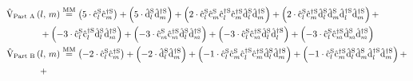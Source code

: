 \begin{equation}
    \label{eq:interaction-picture-v-ham-parts}
    \begin{split}
        \VhamiltonianPartA{l}{m} &\stackrel{\text{MM}}{=} 
            \left(5 \cdot \cop[\schroedingerPicture]{l}{}\cop[\schroedingerPicture]{m}{\dagger}\right)
            +
            \left(5 \cdot \dop[\schroedingerPicture]{l}{}\dop[\schroedingerPicture]{m}{\dagger}\right)
            +
            \left(2 \cdot \cop[\schroedingerPicture]{l}{}\cop[\schroedingerPicture]{m}{}\cop[\schroedingerPicture]{l}{\dagger}\cop[\schroedingerPicture]{m}{\dagger}\dop[\schroedingerPicture]{l}{}\dop[\schroedingerPicture]{m}{\dagger}\right)
            +
            \left(2 \cdot \cop[\schroedingerPicture]{l}{}\cop[\schroedingerPicture]{m}{\dagger}\dop[\schroedingerPicture]{l}{}\dop[\schroedingerPicture]{m}{}\dop[\schroedingerPicture]{l}{\dagger}\dop[\schroedingerPicture]{m}{\dagger}\right)
            +\\&\mkern-40mu+
            \left(-3 \cdot \cop[\schroedingerPicture]{l}{}\cop[\schroedingerPicture]{l}{\dagger}\dop[\schroedingerPicture]{l}{}\dop[\schroedingerPicture]{m}{\dagger}\right)
            +
            \left(-3 \cdot \cop[\schroedingerPicture]{m}{}\cop[\schroedingerPicture]{m}{\dagger}\dop[\schroedingerPicture]{l}{}\dop[\schroedingerPicture]{m}{\dagger}\right)
            +
            \left(-3 \cdot \cop[\schroedingerPicture]{l}{}\cop[\schroedingerPicture]{m}{\dagger}\dop[\schroedingerPicture]{l}{}\dop[\schroedingerPicture]{l}{\dagger}\right)
            +
            \left(-3 \cdot \cop[\schroedingerPicture]{l}{}\cop[\schroedingerPicture]{m}{\dagger}\dop[\schroedingerPicture]{m}{}\dop[\schroedingerPicture]{m}{\dagger}\right)
        \\
        \VhamiltonianPartB{l}{m} &\stackrel{\text{MM}}{=} 
            \left(-2 \cdot \cop[\schroedingerPicture]{l}{}\cop[\schroedingerPicture]{m}{\dagger}\right)
            +
            \left(-2 \cdot \dop[\schroedingerPicture]{l}{}\dop[\schroedingerPicture]{m}{\dagger}\right)
            +
            \left(-1 \cdot \cop[\schroedingerPicture]{l}{}\cop[\schroedingerPicture]{m}{}\cop[\schroedingerPicture]{l}{\dagger}\cop[\schroedingerPicture]{m}{\dagger}\dop[\schroedingerPicture]{l}{}\dop[\schroedingerPicture]{m}{\dagger}\right)
            +
            \left(-1 \cdot \cop[\schroedingerPicture]{l}{}\cop[\schroedingerPicture]{m}{\dagger}\dop[\schroedingerPicture]{l}{}\dop[\schroedingerPicture]{m}{}\dop[\schroedingerPicture]{l}{\dagger}\dop[\schroedingerPicture]{m}{\dagger}\right)
            +\\&\mkern-40mu+

\end{split}
\end{equation}
